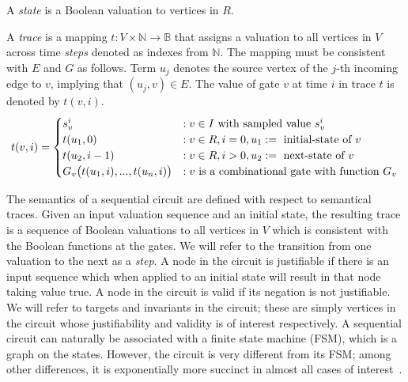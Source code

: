 \begin{definition}[State]
\rm A {\em state} is a Boolean valuation to vertices in $R$. 
\end{definition}

\begin{definition}[Trace]
\rm A {\em trace} is a mapping $t: V \times \mathbb{N} \rightarrow
\mathbb{B}$ that assigns a valuation to all vertices in
$V$ across time {\em steps} denoted as indexes from
$\mathbb{N}$.  The mapping must be consistent with $E$ and
$G$ as follows.  Term $u_{j}$ denotes the source vertex of
the $j$-th incoming edge to $v$, implying that
$(u_{j},v)\in E$.  The value of gate $v$ at time $i$ in
trace $t$ is denoted by $t(v,i)$.
\[
t(v,i)=
   \begin{cases}
      s^i_{v}            &:v \in I \ \text{with sampled value $s_{v}^i$}\\
      t(u_1, 0)       &:v \in R,i=0,u_1:=\ \text{initial-state of $v$}\\
      t(u_2, i-1)        &:v \in R,i>0,u_2:=\ \text{next-state of $v$}\\
      G_v\big(t(u_{1},i),...,t(u_{n},i)\big) &: v \ \text{is a combinational gate with function 
$G_v$}
   \end{cases} \\
\]
\end{definition}

The semantics of a sequential circuit are defined with
respect to semantical traces.  Given an input valuation
sequence and an initial state, the resulting trace is a
sequence of Boolean valuations to all vertices in $V$
which is consistent with the Boolean functions at the
gates.  We will refer to the transition from one valuation
to the next as a {\em step}.  A node in the circuit is
justifiable if there is an input sequence which when
applied to an initial state will result in that node
taking value $\mbox{true}$.  A node in the circuit is
valid if its negation is not justifiable.  We will refer
to targets and invariants in the circuit; these are simply
vertices in the circuit whose justifiability and validity
is of interest respectively.
A sequential circuit can naturally
be associated with a finite state machine (FSM),
which is a graph on the states.  However, the 
circuit is very different from its FSM; among
other differences, it is exponentially more succinct in
almost all cases of interest~\cite{BuClMcDiHw92}. 



